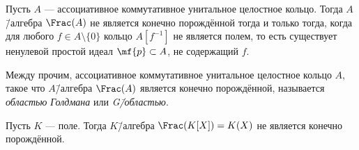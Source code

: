 \documentclass[
	extrafontsizes,
	11pt,
	hyphens,
]{memoir}
\begin{document}
%
%
%
%

\begin{observation}
Пусть \(A\) --- ассоциативное коммутативное унитальное целостное кольцо.%
\label{obs:JacDomFrac}
Тогда \(A\)\=/алгебра \(\Frac(A)\) не является конечно порождённой тогда и только тогда, когда для любого \(f \in A \setminus \{0\}\) кольцо \(A[f^{-1}]\) не является полем, то есть существует ненулевой простой идеал \(\mf{p} \subset A\), не содержащий \(f\).
\end{observation}

\begin{remark}
Между прочим, ассоциативное коммутативное унитальное целостное кольцо \(A\), такое что \(A\)\=/алгебра \(\Frac(A)\) является конечно порождённой, называется \emph{областью Голдмана} или \emph{G\=/областью}.
\end{remark}

\begin{theorem}
Пусть \(K\) --- поле.%
\label{thm:FieldPolyFracInfGen}
Тогда \(K\)\=/алгебра \(\Frac(K[X]) = K(X)\) не является конечно порождённой.
\end{theorem}
\end{document}

